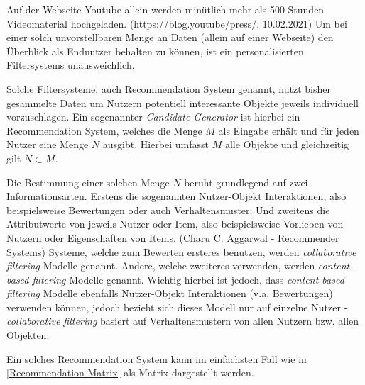 Auf der Webseite Youtube allein werden minütlich mehr als 500 Stunden Videomaterial hochgeladen. (https://blog.youtube/press/, 10.02.2021)
Um bei einer solch unvorstellbaren Menge an Daten (allein auf einer Webseite) den Überblick als Endnutzer behalten zu können, ist ein personalisierten Filtersystems unausweichlich.

Solche Filtersysteme, auch Recommendation System genannt, nutzt bisher gesammelte Daten um Nutzern potentiell interessante Objekte jeweils individuell vorzuschlagen.
Ein sogenannter \textit{Candidate Generator} ist hierbei ein Recommendation System, welches die Menge $M$ als Eingabe erhält und für jeden Nutzer eine Menge $N$ ausgibt. Hierbei umfasst $M$ alle Objekte und gleichzeitig gilt $N \subset M$. 

Die Bestimmung einer solchen Menge $N$ beruht grundlegend auf zwei Informationsarten. Erstens die sogenannten Nutzer-Objekt Interaktionen, also beispielsweise Bewertungen oder auch Verhaltensmuster; Und zweitens die Attributwerte von jeweils Nutzer oder Item, also beispielsweise Vorlieben von Nutzern oder Eigenschaften von Items. (Charu C. Aggarwal - Recommender Systems)
Systeme, welche zum Bewerten ersteres benutzen, werden \textit{collaborative filtering} Modelle genannt. Andere, welche zweiteres verwenden, werden \textit{content-based filtering} Modelle genannt. Wichtig hierbei ist jedoch, dass \textit{content-based filtering} Modelle ebenfalls Nutzer-Objekt Interaktionen (v.a. Bewertungen) verwenden können, jedoch bezieht sich dieses Modell nur auf einzelne Nutzer - \textit{collaborative filtering} basiert auf Verhaltensmustern von allen Nutzern bzw. allen Objekten.

Ein solches Recommendation System kann im einfachsten Fall wie in \ref{Recommendation Matrix} als Matrix dargestellt werden.

